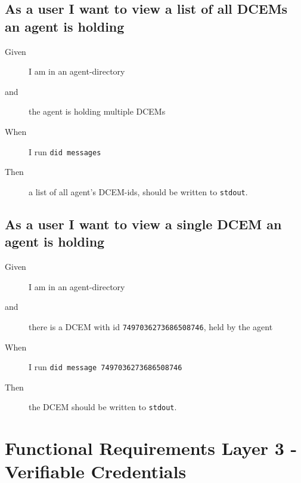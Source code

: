 \subsection{As a user I want to view a list of all DCEMs an agent is holding}
\begin{description}\begin{description}
    \item[Given] I am in an agent-directory
    \item[and] the agent is holding multiple DCEMs
    \item[When] I run \texttt{did messages}
    \item[Then] a list of all agent's DCEM-ids, should be written to \texttt{stdout}.
\end{description}\end{description}



\subsection{As a user I want to view a single DCEM an agent is holding}
\begin{description}\begin{description}
    \item[Given] I am in an agent-directory
    \item[and] there is a DCEM with id \texttt{7497036273686508746}, held by the agent
    \item[When] I run \texttt{did message 7497036273686508746}
    \item[Then] the DCEM should be written to \texttt{stdout}.
\end{description}\end{description}



\newpage



\section{Functional Requirements Layer 3 - Verifiable Credentials}



